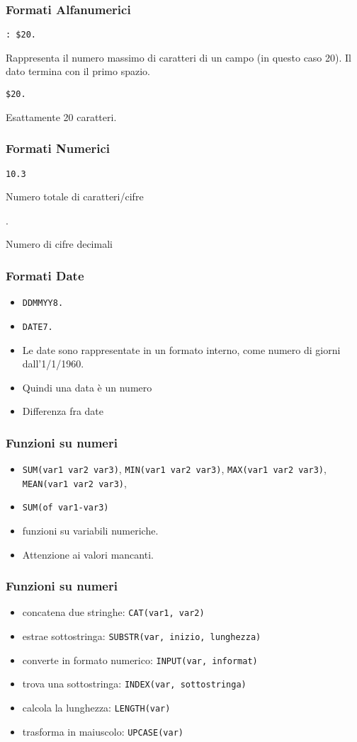 \documentclass[aspectratio=169]{beamer}
\begin{document}
\begin{frame}[fragile]\frametitle{Formati Alfanumerici}
  \verb!: $20.!

  Rappresenta il numero massimo di caratteri di un campo (in questo caso
  20). Il dato termina con il primo spazio.

  \verb!$20.!

  Esattamente 20 caratteri.
\end{frame}

\begin{frame}[fragile]\frametitle{Formati Numerici}
  \verb!10.3!

  Numero totale di caratteri/cifre

  .

  Numero di cifre decimali
\end{frame}



\begin{frame}[fragile]\frametitle{Formati Date}
  \begin{itemize}
  \item
    \verb!DDMMYY8.!
  \item
    \verb!DATE7.!
  \item
    Le date sono rappresentate in un formato interno, come numero di giorni dall'1/1/1960.
  \item
    Quindi una data {\`e} un numero
  \item
    Differenza fra date
  \end{itemize}
\end{frame}

\begin{frame}[fragile]\frametitle{Funzioni su numeri}
  \begin{itemize}
  \item
    \verb!SUM(var1 var2 var3)!,  \verb!MIN(var1 var2 var3)!,
    \verb!MAX(var1 var2 var3)!,     \verb!MEAN(var1 var2 var3)!,
  \item
    \verb!SUM(of var1-var3)!
  \item
    funzioni su variabili numeriche.
  \item
    Attenzione ai valori mancanti.
  \end{itemize}
\end{frame}

\begin{frame}[fragile]\frametitle{Funzioni su numeri}
  \begin{itemize}
  \item
    concatena due stringhe:     \verb!CAT(var1, var2)!
  \item
    estrae sottostringa:
    \verb!SUBSTR(var, inizio, lunghezza)!
  \item
    converte in formato numerico:
    \verb!INPUT(var, informat)!
  \item
  trova una sottostringa:
    \verb!INDEX(var, sottostringa)!
  \item
  calcola la lunghezza:
    \verb!LENGTH(var)!
  \item
  trasforma in maiuscolo:
    \verb!UPCASE(var)!
  \end{itemize}
\end{frame}
\end{document}

